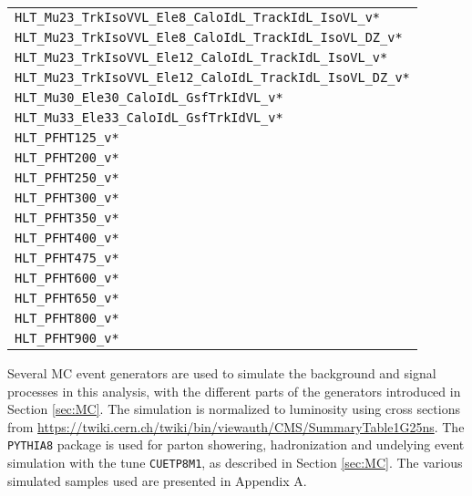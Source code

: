 \begin{table}[ht!]
\begin{center}
\begin{tabular}{ l}
        \texttt{HLT\_Mu23\_TrkIsoVVL\_Ele8\_CaloIdL\_TrackIdL\_IsoVL\_v*}    \\ 
        \texttt{HLT\_Mu23\_TrkIsoVVL\_Ele8\_CaloIdL\_TrackIdL\_IsoVL\_DZ\_v*} \\
        \texttt{HLT\_Mu23\_TrkIsoVVL\_Ele12\_CaloIdL\_TrackIdL\_IsoVL\_v*}    \\ 
        \texttt{HLT\_Mu23\_TrkIsoVVL\_Ele12\_CaloIdL\_TrackIdL\_IsoVL\_DZ\_v*}    \\ 
        \texttt{HLT\_Mu30\_Ele30\_CaloIdL\_GsfTrkIdVL\_v*}            \\
        \texttt{HLT\_Mu33\_Ele33\_CaloIdL\_GsfTrkIdVL\_v*}            \\
        \texttt{HLT\_PFHT125\_v*}                       \\
        \texttt{HLT\_PFHT200\_v*}                       \\
        \texttt{HLT\_PFHT250\_v*}                       \\
        \texttt{HLT\_PFHT300\_v*}                       \\
        \texttt{HLT\_PFHT350\_v*}                       \\
        \texttt{HLT\_PFHT400\_v*}                       \\
        \texttt{HLT\_PFHT475\_v*}                       \\
        \texttt{HLT\_PFHT600\_v*}                       \\
        \texttt{HLT\_PFHT650\_v*}                       \\
        \texttt{HLT\_PFHT800\_v*}                       \\
        \texttt{HLT\_PFHT900\_v*}                       \\
\hline\hline
\end{tabular}
\end{center}
\end{table}                                                                                                          
Several MC event generators are used to simulate the background and signal processes in this analysis, with the different parts of the generators introduced in Section \ref{sec:MC}. 
The simulation is normalized to luminosity using cross sections from \url{https://twiki.cern.ch/twiki/bin/viewauth/CMS/SummaryTable1G25ns}.
The \texttt{PYTHIA8} \cite{Sjostrand:2006za} package is used for parton showering, hadronization and undelying event simulation with the tune \texttt{CUETP8M1}, as described in Section \ref{sec:MC}.
The various simulated samples used are presented in Appendix A.  

